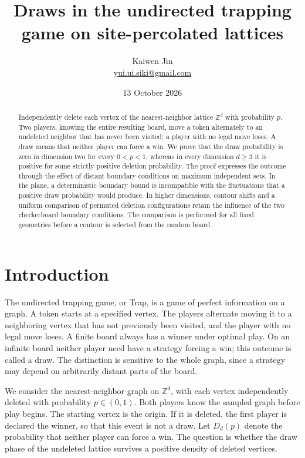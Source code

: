 \documentclass[11pt,a4paper]{article}
\title{Draws in the undirected trapping game on site-percolated lattices}
\author{Kaiwen Jin\\\small\href{mailto:yui.ui.siki@gmail.com}{yui.ui.siki@gmail.com}}
\date{13 October 2026}
\newcommand{\Z}{\mathbb Z}
\numberwithin{equation}{section}
\begin{document}
\maketitle
\begin{abstract}
Independently delete each vertex of the nearest-neighbor lattice
$\Z^d$ with probability $p$. Two players, knowing the entire resulting
board, move a token alternately to an undeleted neighbor that has never
been visited; a player with no legal move loses. A draw means that neither
player can force a win. We prove that the draw probability is zero in
dimension two for every $0<p<1$, whereas in every dimension $d\ge3$
it is positive for some strictly positive deletion probability.
The proof expresses the outcome through the effect of distant boundary
conditions on maximum independent sets. In the plane, a deterministic
boundary bound is incompatible with the fluctuations that a positive draw
probability would produce. In higher dimensions, contour shifts and a
uniform comparison of permuted deletion configurations retain the
influence of the two checkerboard boundary conditions. The comparison is
performed for all fixed geometries before a contour is selected from
the random board.
\end{abstract}

\section{Introduction}\label{sec:introduction}
The undirected trapping game, or Trap, is a game of perfect information
on a graph. A token starts at a specified vertex. The players alternate
moving it to a neighboring vertex that has not previously been visited,
and the player with no legal move loses. A finite board always has a
winner under optimal play. On an infinite board neither player need
have a strategy forcing a win; this outcome is called a draw.
The distinction is sensitive to the whole graph, since a strategy may
depend on arbitrarily distant parts of the board.

We consider the nearest-neighbor graph on $\Z^d$, with each vertex
independently deleted with probability $p\in(0,1)$. Both players know
the sampled graph before play begins. The starting vertex is the origin.
If it is deleted, the first player is declared the winner, so that this
event is not a draw. Let $D_d(p)$ denote the probability that neither
player can force a win. The question is whether the draw phase of the
undeleted lattice survives a positive density of deleted vertices.
\end{document}
